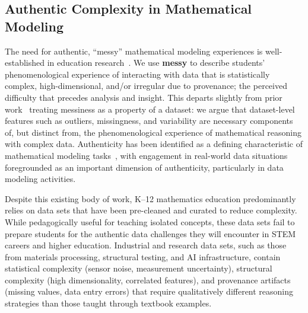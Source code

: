 \documentclass[11pt]{article}
\begin{document}
\subsection{Authentic Complexity in Mathematical Modeling}

The need for authentic, ``messy'' mathematical modeling experiences is well-established in education research~\cite{lesh2003foundations, Garfunkel2019}.
We use \textbf{messy} to describe students' phenomenological experience of interacting with data that is statistically complex, high-dimensional, and/or irregular due to provenance; the perceived difficulty that precedes analysis and insight.
This departs slightly from prior work~\cite{kjelvik2019getting} treating messiness as a property of a dataset: we argue that dataset-level features such as outliers, missingness, and variability are necessary components of, but distinct from, the phenomenological experience of mathematical reasoning with complex data.
Authenticity has been identified as a defining characteristic of mathematical modeling tasks~\cite{palm2007features, kaiser2017teaching}, with engagement in real-world data situations foregrounded as an important dimension of authenticity, particularly in data modeling activities. 

Despite this existing body of work, K–12 mathematics education predominantly relies on data sets that have been pre-cleaned and curated to reduce complexity.
While pedagogically useful for teaching isolated concepts, these data sets fail to prepare students for the authentic data challenges they will encounter in STEM careers and higher education.
Industrial and research data sets, such as those from materials processing, structural testing, and AI infrastructure, contain statistical complexity (sensor noise, measurement uncertainty), structural complexity (high dimensionality, correlated features), and provenance artifacts (missing values, data entry errors) that require qualitatively different reasoning strategies than those taught through textbook examples.~\cite{kjelvik2019getting}
\end{document}
